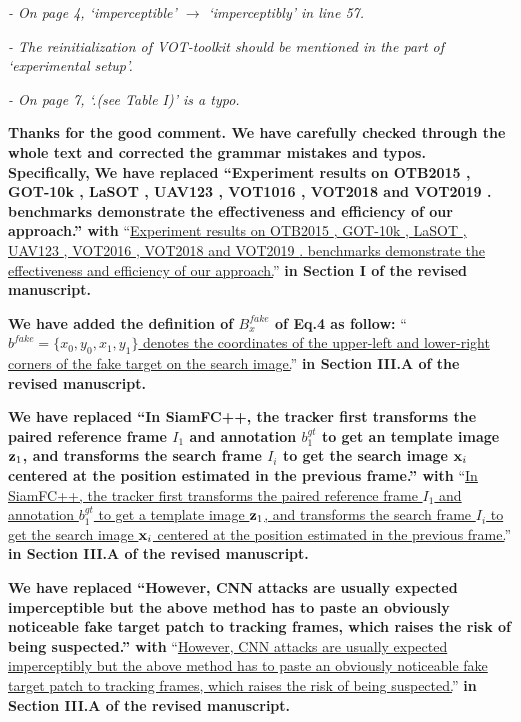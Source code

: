 \documentclass[12pt]{article}
\begin{document}
\textit{- On page 4, ‘imperceptible’ $\rightarrow$ ‘imperceptibly’ in line 57.}

\textit{- The reinitialization of VOT-toolkit should be mentioned in the part of ‘experimental setup’.}

\textit{- On page 7, ‘.(see Table I)’ is a typo.}

\textbf{Thanks for the good comment. We have carefully checked through the whole text and corrected the grammar mistakes and typos. Specifically,}
\textbf{We have replaced ``Experiment results on OTB2015 \cite{OTB}, GOT-10k \cite{GOT-10k}, LaSOT \cite{GOT-10k}, UAV123 \cite{UAV123}, VOT1016 \cite{VOT2016}, VOT2018 \cite{VOT2018} and VOT2019 \cite{VOT2019}. benchmarks demonstrate the effectiveness and efficiency of our approach.'' with}
``\uline{Experiment results on OTB2015 \cite{OTB}, GOT-10k \cite{GOT-10k}, LaSOT \cite{LaSOT}, UAV123 \cite{UAV123}, VOT2016 \cite{VOT2016}, VOT2018 \cite{VOT2018} and VOT2019 \cite{VOT2019}. benchmarks demonstrate the effectiveness and efficiency of our approach.}''
\textbf{in Section I of the revised manuscript.}

\textbf{We have added the definition of $B_x^{fake}$ of Eq.4 as follow:}
``\uline{$b^{fake} = \{x_0, y_0, x_1, y_1\}$ denotes the coordinates of the upper-left and lower-right corners of the fake target on the search image.}''
\textbf{in Section III.A of the revised manuscript.}

\textbf{We have replaced ``In SiamFC++, the tracker first transforms the paired reference frame $I_1$ and annotation $b_1^{gt}$ to get an template image $\textbf z_1$, and transforms the search frame $I_i$ to get the search image $\textbf x_i$ centered at the position estimated in the previous frame.'' with}
``\uline{In SiamFC++, the tracker first transforms the paired reference frame $I_1$ and annotation $b_1^{gt}$ to get a template image $\textbf z_1$, and transforms the search frame $I_i$ to get the search image $\textbf x_i$ centered at the position estimated in the previous frame.}''
\textbf{in Section III.A of the revised manuscript.}

\textbf{We have replaced ``However, CNN attacks are usually expected imperceptible but the above method has to paste an obviously noticeable fake target patch to tracking frames, which raises the risk of being suspected.'' with}
``\uline{However, CNN attacks are usually expected imperceptibly but the above method has to paste an obviously noticeable fake target patch to tracking frames, which raises the risk of being suspected.}''
\textbf{in Section III.A of the revised manuscript.}
\end{document}
